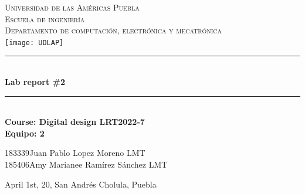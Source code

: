 \documentclass[12pt]{article}  %
\def\titulo{Lab report \#2}%
\def\materia{Course: Digital design LRT2022-7} %
\def\fecha{April 1st, 20} %
\def\equipo {2}%
\def\ida{183339} %
\def\esta{Juan Pablo Lopez Moreno}
\def\lica{LMT}%
\def\idb{185406}
\def\estb{Amy Marianee Ramírez Sánchez}
\def\licb{LMT}%
\begin{document}
\begin{center}														
\newcommand{\HRule}{\rule{\linewidth}{0.5mm}}						
\thispagestyle{empty} 												
\vspace*{-1.5cm}								
\textsc{\huge Universidad de las Américas Puebla}\\[1.5cm]	
\textsc{\LARGE Escuela de ingeniería}\\[1.5cm]	
\textsc{\LARGE Departamento de computación, electrónica y mecatrónica}\\[1.5cm]												
\texttt{[image: UDLAP]}  									\vspace*{1cm}														\HRule \\[0.4cm]												
{ \huge \bfseries \titulo}\\[0.4cm]	
\HRule \\[1cm]														
{ \Large \bfseries \materia}\\[1cm] 	
{ \Large \bfseries Equipo: \equipo}\\[1cm] 							
\begin{flushleft} \Large											
\ida \hspace{0.5cm}\esta \hspace{0.5cm} \lica\\
\idb \hspace{0.5cm}\estb \hspace{0.5cm} \licb\\
\end{flushleft}														
\vfill																
\begin{center}													
{\Large  \fecha, San Andrés Cholula, Puebla}						
\end{center}												 		
\end{center}							 								\newpage						
\setcounter{page}{1} %
\end{document}
